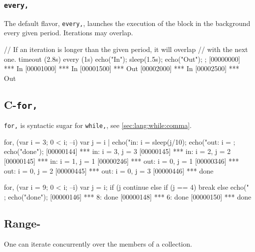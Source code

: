 \subsubsection{\lstinline{every,}}
\label{sec:lang:every:comma}
The default flavor, \lstinline|every,|, launches the execution of the
block in the background every given period. Iterations may overlap.

\begin{urbiscript}[firstnumber=1]
// If an iteration is longer than the given period, it will overlap
// with the next one.
timeout (2.8s)
  every (1s)
  {
    echo("In");
    sleep(1.5s);
    echo("Out");
  };
[00000000] *** In
[00001000] *** In
[00001500] *** Out
[00002000] *** In
[00002500] *** Out
\end{urbiscript}

\subsection{C-\lstinline{for,}}
\label{sec:lang:forc:comma}
\experimentalremoved{}

\lstinline|for,| is syntactic sugar for \lstinline|while,|, see
\autoref{sec:lang:while:comma}.

\begin{urbiscript}
for, (var i = 3; 0 < i; --i)
{
  var j = i |
  echo("in: i = %
  sleep(j/10);
  echo("out: i = %
};
echo("done");
[00000144] *** in: i = 3, j = 3
[00000145] *** in: i = 2, j = 2
[00000145] *** in: i = 1, j = 1
[00000246] *** out: i = 0, j = 1
[00000346] *** out: i = 0, j = 2
[00000445] *** out: i = 0, j = 3
[00000446] *** done
\end{urbiscript}

\begin{urbiscript}
for, (var i = 9; 0 < i; --i)
{
  var j = i;
  if (j %
    continue
  else if (j == 4)
    break
  else
    echo("%
};
echo("done");
[00000146] *** 8: done
[00000148] *** 6: done
[00000150] *** done
\end{urbiscript}


\subsection{Range-\forAnd}
\label{sec:lang:foreach:and}

One can iterate concurrently over the members of a collection.

